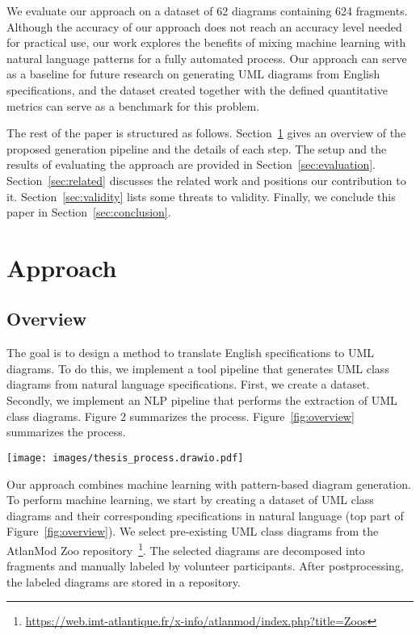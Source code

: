 \documentclass[sigconf]{acmart}
\begin{document}
We evaluate our approach on a dataset of 62 diagrams containing 624 fragments. Although the accuracy of our approach does not reach an accuracy level needed for practical use, our work explores the benefits of mixing machine learning with natural language patterns for a fully automated process. Our approach can serve as a baseline for future research on generating UML diagrams from English specifications, and the dataset created together with the defined quantitative metrics can serve as a benchmark for this problem.

The rest of the paper is structured as follows. Section~\ref{Sec:approach} gives an overview of the proposed generation pipeline and the details of each step. The setup and the results of evaluating the approach are provided in Section~\ref{sec:evaluation}. Section~\ref{sec:related} discusses the related work and positions our contribution to it. Section~\ref{sec:validity} lists some threats to validity. Finally, we conclude this paper in Section~\ref{sec:conclusion}.

\section{Approach}
\label{Sec:approach}
\subsection{Overview}

The goal is to design a method to translate English specifications to UML diagrams. To do this, we implement a tool pipeline that generates UML class diagrams from natural language specifications. First, we create a dataset. Secondly, we implement an NLP pipeline that performs the extraction of UML class diagrams. Figure 2 summarizes the process. Figure~\ref{fig:overview} summarizes the process.

\begin{figure*}[h]
    \centering
    \texttt{[image: images/thesis\_process.drawio.pdf]}
    \caption{Overview of the extraction process of UML class diagrams from natural language specification}
    \label{fig:overview}
\end{figure*}

Our approach combines machine learning with pattern-based diagram generation. To perform machine learning, we start by creating a dataset of UML class diagrams and their corresponding specifications in natural language (top part of Figure~\ref{fig:overview}). We select pre-existing UML class diagrams from the AtlanMod Zoo repository~\footnote{\url{https://web.imt-atlantique.fr/x-info/atlanmod/index.php?title=Zoos}}. The selected diagrams are decomposed into fragments and manually labeled by volunteer participants. After postprocessing, the labeled diagrams are stored in a repository.
\end{document}
